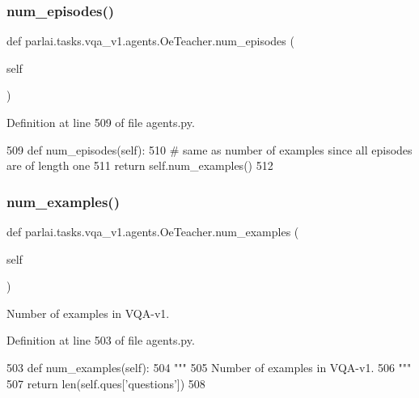 \subsubsection{\texorpdfstring{num\+\_\+episodes()}{num\_episodes()}}
{\footnotesize\ttfamily def parlai.\+tasks.\+vqa\+\_\+v1.\+agents.\+Oe\+Teacher.\+num\+\_\+episodes (\begin{DoxyParamCaption}\item[{}]{self }\end{DoxyParamCaption})}



Definition at line 509 of file agents.\+py.


\begin{DoxyCode}
509     \textcolor{keyword}{def }num\_episodes(self):
510         \textcolor{comment}{# same as number of examples since all episodes are of length one}
511         \textcolor{keywordflow}{return} self.num\_examples()
512 
\end{DoxyCode}
\mbox{\label{classparlai_1_1tasks_1_1vqa__v1_1_1agents_1_1OeTeacher_acc1841e8be4613043d9674d014e06f70}} 
\subsubsection{\texorpdfstring{num\+\_\+examples()}{num\_examples()}}
{\footnotesize\ttfamily def parlai.\+tasks.\+vqa\+\_\+v1.\+agents.\+Oe\+Teacher.\+num\+\_\+examples (\begin{DoxyParamCaption}\item[{}]{self }\end{DoxyParamCaption})}

\begin{DoxyVerb}Number of examples in VQA-v1.
\end{DoxyVerb}
 

Definition at line 503 of file agents.\+py.


\begin{DoxyCode}
503     \textcolor{keyword}{def }num\_examples(self):
504         \textcolor{stringliteral}{"""}
505 \textcolor{stringliteral}{        Number of examples in VQA-v1.}
506 \textcolor{stringliteral}{        """}
507         \textcolor{keywordflow}{return} len(self.ques[\textcolor{stringliteral}{'questions'}])
508 
\end{DoxyCode}
\mbox{\label{classparlai_1_1tasks_1_1vqa__v1_1_1agents_1_1OeTeacher_a5541625a47721863f58db94177ce1114}} 

